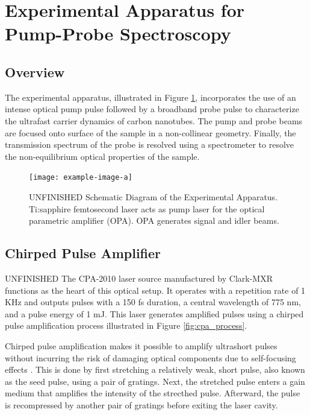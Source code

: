 \section{Experimental Apparatus for Pump-Probe Spectroscopy}

\subsection{Overview}
The experimental apparatus, illustrated in Figure \ref{fig:setup_schematic}, incorporates the use of an intense optical pump pulse followed by a broadband probe pulse to characterize the ultrafast carrier dynamics of carbon nanotubes. The pump and probe beams are focused onto surface of the sample in a non-collinear geometry. Finally, the transmission spectrum of the probe is resolved using a spectrometer to resolve the non-equilibrium optical properties of the sample.  


\begin{figure}[h]
	\centering
	\texttt{[image: example-image-a]}
	\caption{{ \color{red} UNFINISHED} Schematic Diagram of the Experimental Apparatus. Ti:sapphire femtosecond laser acts as pump laser for the optical parametric amplifier (OPA). OPA generates signal and idler beams.  }
	\label{fig:setup_schematic}
\end{figure}


\subsection{Chirped Pulse Amplifier}
{\color{red} UNFINISHED} The CPA-2010 laser source manufactured by Clark-MXR functions as the heart of this optical setup. It operates with a repetition rate of 1 KHz and outputs pulses with a 150 fs duration, a central wavelength of 775 nm, and a pulse energy of 1 mJ. This laser generates amplified pulses using a chirped pulse amplification process illustrated in Figure \ref{fig:cpa_process}. 

Chirped pulse amplification makes it possible to amplify ultrashort pulses without incurring the risk of damaging optical components due to self-focusing effects \cite{strickland1985compression}. This is done by first stretching a relatively weak, short pulse, also known as the seed pulse, using a pair of gratings. Next, the stretched pulse enters a gain medium that amplifies the intensity of the strecthed pulse. Afterward, the pulse is recompressed by another pair of gratings before exiting the laser cavity. 

